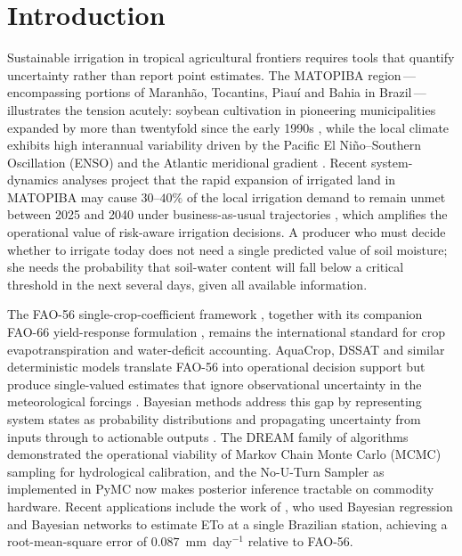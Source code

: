 \documentclass[review,5p,times]{elsarticle}
\begin{document}
\section{Introduction}\label{sec:intro}

Sustainable irrigation in tropical agricultural frontiers requires tools
that quantify uncertainty rather than report point estimates.
The MATOPIBA region\,---\,encompassing portions of Maranh\~ao, Tocantins,
Piau\'i and Bahia in Brazil\,---\,illustrates the tension acutely:
soybean cultivation in pioneering municipalities expanded by more than
twentyfold since the early 1990s \cite{Pousa2019,Santos2023}, while the
local climate exhibits high interannual variability driven by the
Pacific El Ni\~no--Southern Oscillation (ENSO) and the Atlantic
meridional gradient \cite{Grimm2003,Marengo2018}. Recent
system-dynamics analyses project that the rapid expansion of
irrigated land in MATOPIBA may cause $30$--$40\%$ of the local
irrigation demand to remain unmet between 2025 and 2040 under
business-as-usual trajectories \citep{Martins2024MATOPIBA}, which
amplifies the operational value of risk-aware irrigation decisions. A producer who must
decide whether to irrigate today does not need a single predicted value
of soil moisture; she needs the probability that soil-water content
will fall below a critical threshold in the next several days, given
all available information.

The FAO-56 single-crop-coefficient framework \cite{Allen1998}, together
with its companion FAO-66 yield-response formulation
\cite{Steduto2012}, remains the international standard for crop
evapotranspiration and water-deficit accounting. AquaCrop, DSSAT and
similar deterministic models translate FAO-56 into operational decision
support but produce single-valued estimates that ignore observational
uncertainty in the meteorological forcings \cite{Liu2007,Vrugt2016}.
Bayesian methods address this gap by representing system states as
probability distributions and propagating uncertainty from inputs
through to actionable outputs \cite{Gelman2013}. The DREAM family of
algorithms \cite{Vrugt2009,Vrugt2016} demonstrated the operational
viability of Markov Chain Monte Carlo (MCMC) sampling for hydrological
calibration, and the No-U-Turn Sampler \cite{Hoffman2014} as
implemented in PyMC \cite{AbrilPla2023} now makes posterior inference
tractable on commodity hardware. Recent applications include the work
of \cite{Ribeiro2023}, who used Bayesian regression and Bayesian
networks to estimate ETo at a single Brazilian station, achieving a
root-mean-square error of $0.087$~mm~day$^{-1}$ relative to FAO-56.
\end{document}
